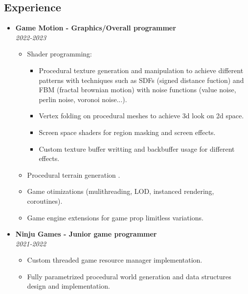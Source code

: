 \documentclass[9pt,oneside,a4paper,titlepage]{article}
\begin{document}
\begin{tcolorbox}
\begin{minipage}[t]{11cm}
\begin{tcolorbox}[grow to right by=0.75cm, colframe=white,colback=white]
			\section*{Experience}
			\begin{itemize}
				\item{
				      \textbf{Game Motion - Graphics/Overall programmer} \\
				      \emph{2022-2023}\\
				      \begin{itemize}
					      \vspace*{-0.5cm}
					      \item{Shader programming:
					            \begin{itemize}
						            \item{Procedural texture generation and manipulation to achieve different patterns with techniques such as SDFs (signed distance fuction) and FBM (fractal brownian motion) with noise functions  (value noise, perlin noise, voronoi noise...).}
						            \item{Vertex folding on procedural meshes to achieve 3d look on 2d space.}
						            \item{Screen space shaders for region masking and screen effects.}
						            \item{Custom texture buffer writting and  backbuffer usage for different effects.}
					            \end{itemize}
					            }
					      \item{Procedural terrain generation .}
					      \item{Game otimizations (mulithreading, LOD, instanced rendering, coroutines).}
					      \item{Game engine extensions for game prop limitless variations.}
				      \end{itemize}
				      }
				      \item{
				            \textbf{Ninju Games - Junior game programmer} \\
				            \emph{2021-2022} \\
				            \vspace*{-0.5cm}
				            \begin{itemize}
				      	      \item{Custom threaded game resource manager implementation.}
				      	      \item{Fully parametrized procedural world generation and data structures design and implementation.}

\end{itemize}}
\end{itemize}
\end{tcolorbox}
\end{minipage}
\end{tcolorbox}
\end{document}
